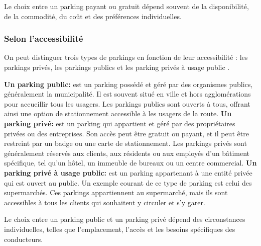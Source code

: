 Le choix entre un parking payant ou gratuit dépend souvent de la disponibilité, de la commodité, du coût et des préférences individuelles.

\subsubsection{Selon l'accessibilité}
On peut distinguer trois types de parkings en fonction de leur accessibilité : les parkings privés, les parkings publics et les parking privés à usage public \cite{lepermislibre}.

\begin{outline}
    \1  \textbf{Un parking public: } est un parking possédé et géré par des organismes publics, généralement la municipalité. Il est souvent situé en ville et hors agglomérations pour accueillir tous les usagers. Les parkings publics sont ouverts à tous, offrant ainsi une option de stationnement accessible à les usagers de la route.
    \1  \textbf{Un parking privé: } est un parking qui appartient et géré par des propriétaires privées ou des entreprises. Son accès peut être gratuit ou payant, et il peut être restreint par un badge ou une carte de stationnement. Les parkings privés sont généralement réservés aux clients, aux résidents ou aux employés d'un bâtiment spécifique, tel qu'un hôtel, un immeuble de bureaux ou un centre commercial. 
    \1  \textbf{Un parking privé à usage public: } est un parking appartenant à une entité privée qui est ouvert au public. 
    Un exemple courant de ce type de parking est celui des supermarchés. Ces parkings appartiennent au supermarché, mais ils sont accessibles à tous les clients qui souhaitent y circuler et s'y garer.

\end{outline}

Le choix entre un parking public et un parking privé dépend des circonstances individuelles, telles que l'emplacement, l'accès et les besoins spécifiques des conducteurs. 

